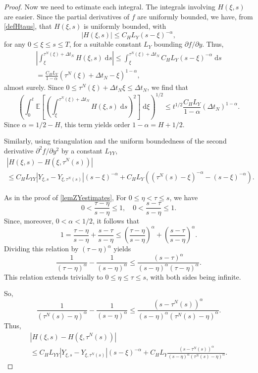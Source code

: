 \documentclass[reqno,12pt]{amsart}
\theoremstyle{plain}%
\theoremstyle{definition}
\begin{document}
\begin{proof}
    Now we need to estimate each integral. The integrals involving $H(\xi,s)$ are easier. Since the partial derivatives of $f$ are uniformly bounded, we have, from \eqref{defHtaus}, that $H(\xi, s)$ is uniformly bounded, with
    \[
        \left|H(\xi, s)\right| \leq C_H L_Y (s - \xi)^{-\alpha},
    \]
    for any $0\leq \xi \leq s \leq T$, for a suitable constant $L_Y$ bounding $\partial f/\partial y$. Thus,
    \begin{multline*}
        \left|\int_\xi^{\tau^N(\xi) + \Delta t_N} H(\xi, s) \;\mathrm{d}s\right| \leq \int_\xi^{\tau^N(\xi) + \Delta t_N} C_H L_Y (s - \xi)^{-\alpha} \;\mathrm{d}s \\
        = \frac{C_H L_Y}{1 - \alpha} (\tau^N(\xi) + \Delta t_N - \xi)^{1-\alpha},
    \end{multline*}
    almost surely. Since $0 \leq \tau^N(\xi) + \Delta t_N \xi \leq \Delta t_N$, we find that
    \begin{equation}
        \left(\int_0^t\mathbb{E}\left[\left(\int_\xi^{\tau^N(\xi) + \Delta t_N} H(\xi, s) \;\mathrm{d}s\right)^2\right]\;\mathrm{d}\xi\right)^{1/2} \leq t^{1/2}\frac{C_H L_Y}{1 - \alpha} (\Delta t_N)^{1-\alpha}.
    \end{equation}
    Since $\alpha = 1/2 - H$, this term yields order $1-\alpha = H + 1/2$.

    Similarly, using triangulation and the uniform boundedness of the second derivative $\partial^2 f/\partial y^2$ by a constant $L_{YY}$,
    \begin{multline*}
        \left|H(\xi, s) - H(\xi, \tau^N(s))\right| \\ 
        \leq C_H L_{YY} \left|Y_{\xi, s} - Y_{\xi, \tau^N(s)}\right|(s - \xi)^{-\alpha} + C_H L_Y ((\tau^N(s) - \xi)^{-\alpha} - (s - \xi)^{-\alpha}).
    \end{multline*}

    As in the proof of \cref{lemZYestimates},
    For $0 \leq \eta < \tau \leq s$, we have
    \[
        0 < \frac{\tau - \eta}{s - \eta} \leq 1, \quad 0 < \frac{s - \tau}{s - \eta} \leq 1.
    \]
    Since, moreover, $0 < \alpha < 1/2$, it follows that
    \[
        1 = \frac{\tau - \eta}{s - \eta} + \frac{s - \tau}{s - \eta} \leq \left(\frac{\tau - \eta}{s - \eta}\right)^\alpha + \left(\frac{s - \tau}{s - \eta}\right)^\alpha.
    \]
    Dividing this relation by $(\tau - \eta)^\alpha$ yields
    \[
        \frac{1}{(\tau - \eta)^\alpha} - \frac{1}{(s - \eta)^\alpha} \leq \frac{(s - \tau)^\alpha}{(s-\eta)^\alpha(\tau - \eta)^\alpha}.
    \]
    This relation extends trivially to $0 \leq \eta \leq \tau \leq s$, with both sides being infinite.

    So,
    \[
        \frac{1}{(\tau^N(s) - \eta)^\alpha} - \frac{1}{(s - \eta)^\alpha} \leq \frac{(s - \tau^N(s))^\alpha}{(s-\eta)^\alpha(\tau^N(s) - \eta)^\alpha}.
    \]
    Thus,
    \begin{multline*}
        \left|H(\xi, s) - H(\xi, \tau^N(s))\right| \\ 
        \leq C_H L_{YY} \left|Y_{\xi, s} - Y_{\xi, \tau^N(s)}\right|(s - \xi)^{-\alpha} + C_H L_Y \frac{(s - \tau^N(s))^\alpha}{(s-\eta)^\alpha(\tau^N(s) - \eta)^\alpha}.
    \end{multline*}
\end{proof}
\end{document}
